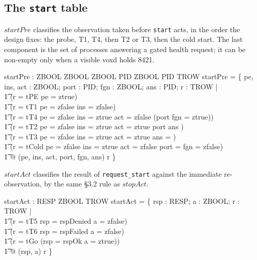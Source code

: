 \documentclass[a4paper,10pt,fleqn]{article}
\begin{document}
\subsection{The \texttt{start} table}

$startPre$ classifies the observation taken before \texttt{start} acts, in
the order the design fixes: the probe, T1, T4, then T2 or T3, then the cold
start. The last component is the set of processes answering a gated health
request; it can be non-empty only when a visible voxd holds 8421.

\begin{axdef}
  startPre : ZBOOL \cross ZBOOL \cross ZBOOL \cross \power PID \cross ZBOOL
    \cross \power PID \rel TROW
\where
  startPre = \{ pe, ins, act : ZBOOL; port : \power PID; fgn : ZBOOL;
      ans : \power PID; r : TROW | \\
  \t1 (r = tPE \land pe = ztrue) \lor \\
  \t1 (r = tT1 \land pe = zfalse \land ins = zfalse) \lor \\
  \t1 (r = tT4 \land pe = zfalse \land ins = ztrue \land act = zfalse \land
      (port \neq \emptyset \lor fgn = ztrue)) \lor \\
  \t1 (r = tT2 \land pe = zfalse \land ins = ztrue \land act = ztrue \land
      port \neq \emptyset \land ans \neq \emptyset) \lor \\
  \t1 (r = tT3 \land pe = zfalse \land ins = ztrue \land act = ztrue \land
      ans = \emptyset) \lor \\
  \t1 (r = tCold \land pe = zfalse \land ins = ztrue \land act = zfalse \land
      port = \emptyset \land fgn = zfalse) \\
  \t1 @ (pe, ins, act, port, fgn, ans) \mapsto r \}
\end{axdef}

$startAct$ classifies the result of \texttt{request\_start} against the
immediate re-observation, by the same \S3.2 rule as $stopAct$.

\begin{axdef}
  startAct : RESP \cross ZBOOL \rel TROW
\where
  startAct = \{ rsp : RESP; a : ZBOOL; r : TROW | \\
  \t1 (r = tT5 \land rsp = rspDenied \land a = zfalse) \lor \\
  \t1 (r = tT6 \land rsp = rspFailed \land a = zfalse) \lor \\
  \t1 (r = tGo \land (rsp = rspOk \lor a = ztrue)) \\
  \t1 @ (rsp, a) \mapsto r \}
\end{axdef}
\end{document}
